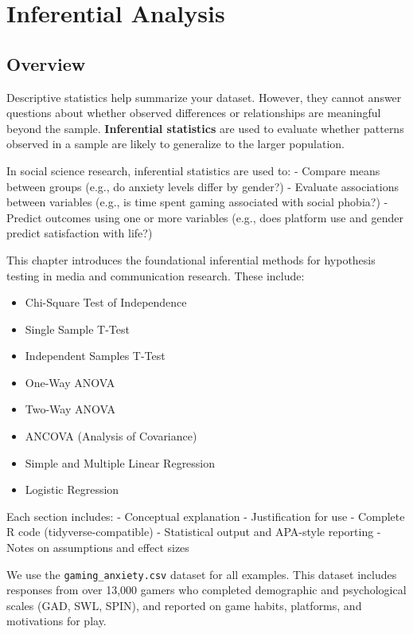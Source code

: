 \documentclass[
]{book}
\providecommand{\tightlist}{%
  \setlength{\itemsep}{0pt}\setlength{\parskip}{0pt}}
\begin{document}
\chapter{Inferential Analysis}\label{inferential-analysis}

\section{Overview}\label{overview-2}

Descriptive statistics help summarize your dataset. However, they cannot answer questions about whether observed differences or relationships are meaningful beyond the sample. \textbf{Inferential statistics} are used to evaluate whether patterns observed in a sample are likely to generalize to the larger population.

In social science research, inferential statistics are used to:
- Compare means between groups (e.g., do anxiety levels differ by gender?)
- Evaluate associations between variables (e.g., is time spent gaming associated with social phobia?)
- Predict outcomes using one or more variables (e.g., does platform use and gender predict satisfaction with life?)

This chapter introduces the foundational inferential methods for hypothesis testing in media and communication research. These include:

\begin{itemize}
\tightlist
\item
  Chi-Square Test of Independence
\item
  Single Sample T-Test
\item
  Independent Samples T-Test
\item
  One-Way ANOVA
\item
  Two-Way ANOVA
\item
  ANCOVA (Analysis of Covariance)
\item
  Simple and Multiple Linear Regression
\item
  Logistic Regression
\end{itemize}

Each section includes:
- Conceptual explanation
- Justification for use
- Complete R code (tidyverse-compatible)
- Statistical output and APA-style reporting
- Notes on assumptions and effect sizes

We use the \texttt{gaming\_anxiety.csv} dataset for all examples. This dataset includes responses from over 13,000 gamers who completed demographic and psychological scales (GAD, SWL, SPIN), and reported on game habits, platforms, and motivations for play.
\end{document}
